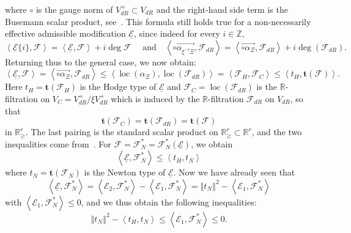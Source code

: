 \documentclass[11pt]{article}
\theoremstyle{definition}
\numberwithin{equation}{section}
\numberwithin{figure}{section}
\numberwithin{table}{section}
\DeclareMathOperator{\loc}{loc}
\newcommand*{\dR}{dR}
\begin{document}
where $\circ$ is the gauge norm of $V_{\dR}^{+}\subset V_{\dR}$ and the right-hand side term is the Busemann scalar product, see~\cite[6.4.15]{Co14}. This formula still holds true for a non-necessarily effective admissible modification $\underline{\mathcal{E}}$, since indeed for every $i\in\mathbb{Z}$,
\[
\left\langle \underline{\mathcal{E}}\{i\},\mathcal{F}\right\rangle =\left\langle \underline{\mathcal{E}},\mathcal{F}\right\rangle +i\deg\mathcal{F}\quad\text{ and}\quad\left\langle \overrightarrow{\circ\alpha_{\xi^{-i}\Xi}},\mathcal{F}_{\dR}\right\rangle =\left\langle \overrightarrow{\circ\alpha_{\Xi}},\mathcal{F}_{\dR}\right\rangle +i\deg(\mathcal{F}_{\dR}).
\]
Returning thus to the general case, we now obtain:
\[
\left\langle \underline{\mathcal{E}},\mathcal{F}\right\rangle =\left\langle \overrightarrow{\circ\alpha_{\Xi}},\mathcal{F}_{\dR}\right\rangle \leq\left\langle \loc(\alpha_{\Xi}),\loc(\mathcal{F}_{\dR})\right\rangle =\left\langle \mathcal{F}_{H},\mathcal{F}_{C}\right\rangle \leq\left\langle t_{H},\mathbf{t}(\mathcal{F})\right\rangle.
\]
Here $t_{H}=\mathbf{t}(\mathcal{F}_{H})$ is the Hodge type of $\underline{\mathcal{E}}$ and $\mathcal{F}_{C}=\loc(\mathcal{F}_{\dR})$ is the $\mathbb{R}$-filtration on $V_{C}=V_{\dR}^{+}/\xi V_{\dR}^{+}$ which is induced by the $\mathbb{R}$-filtration $\mathcal{F}_{\dR}$ on $V_{\dR}$, so that
\[
\mathbf{t}(\mathcal{F}_{C})=\mathbf{t}(\mathcal{F}_{\dR})=\mathbf{t}(\mathcal{F})
\]
in $\mathbb{R}_{\geq}^{r}$. The last pairing is the standard scalar product on $\mathbb{R}_{\geq}^{r}\subset\mathbb{R}^{r}$, and the two inequalities come from~\cite[4.2 \& 5.5]{Co14}. For $\mathcal{F}=\mathcal{F}_{N}^{\ast}=\mathcal{F}_{N}^{\ast}(\underline{\mathcal{E}})$, we obtain
\[
\left\langle \underline{\mathcal{E}},\mathcal{F}_{N}^{\ast}\right\rangle \leq\left\langle t_{H},t_{N}\right\rangle
\]
where $t_{N}=\mathbf{t}(\mathcal{F}_{N})$ is the Newton type of $\underline{\mathcal{E}}$. Now we have already seen that
\[
\left\langle \underline{\mathcal{E}},\mathcal{F}_{N}^{\ast}\right\rangle =\left\langle \mathcal{E}_{2},\mathcal{F}_{N}^{\ast}\right\rangle -\left\langle \mathcal{E}_{1},\mathcal{F}_{N}^{\ast}\right\rangle =\left\Vert t_{N}\right\Vert ^{2}-\left\langle \mathcal{E}_{1},\mathcal{F}_{N}^{\ast}\right\rangle
\]
with $\left\langle \mathcal{E}_{1},\mathcal{F}_{N}^{\ast}\right\rangle
\leq0$, and we thus obtain the following inequalities:
\[
\left\Vert t_{N}\right\Vert ^{2}-\left\langle t_{H},t_{N}\right\rangle \leq\left\langle \mathcal{E}_{1},\mathcal{F}_{N}^{\ast}\right\rangle \leq0.
\]
\end{document}
